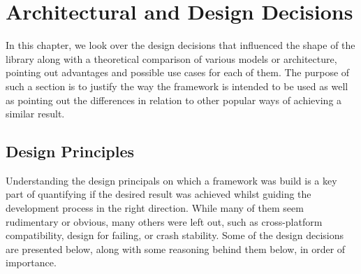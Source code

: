 \chapter{Architectural and Design Decisions}
In this chapter, we look over the design decisions that influenced the shape of the library along with a theoretical comparison of various models or architecture, pointing out advantages and possible use cases for each of them. The purpose of such a section is to justify the way the framework is intended to be used as well as pointing out the differences in relation to other popular ways of achieving a similar result.

\section{Design Principles}
Understanding the design principals on which a framework was build is a key part of quantifying if the desired result was achieved whilst guiding the development process in the right direction.
While many of them seem rudimentary or obvious, many others were left out, such as cross-platform compatibility, design for failing, or crash stability. Some of the design decisions are presented below, along with some reasoning behind them below, in order of importance.

